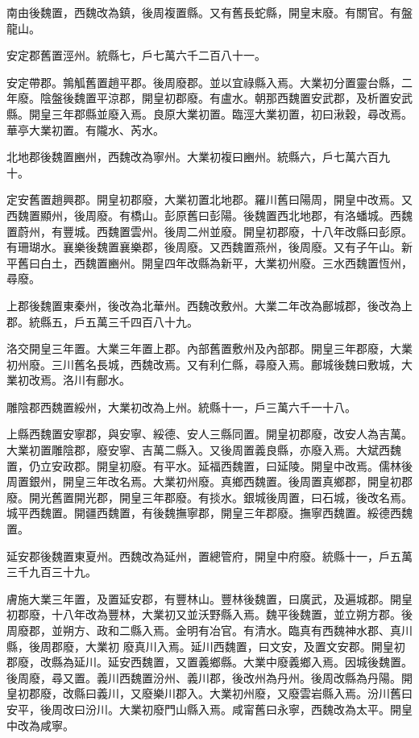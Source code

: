 \begin{pinyinscope}
 南由後魏置，西魏改為鎮，後周複置縣。又有舊長蛇縣，開皇末廢。有關官。有盤龍山。



 安定郡舊置涇州。統縣七，戶七萬六千二百八十一。



 安定帶郡。鶉觚舊置趙平郡。後周廢郡。並以宜祿縣入焉。大業初分置靈台縣，二年廢。陰盤後魏置平涼郡，開皇初郡廢。有盧水。朝那西魏置安武郡，及析置安武縣。開皇三年郡縣並廢入焉。良原大業初置。臨涇大業初置，初曰湫穀，尋改焉。華亭大業初置。有隴水、芮水。



 北地郡後魏置豳州，西魏改為寧州。大業初複曰豳州。統縣六，戶七萬六百九
 十。



 定安舊置趙興郡。開皇初郡廢，大業初置北地郡。羅川舊曰陽周，開皇中改焉。又西魏置顯州，後周廢。有橋山。彭原舊曰彭陽。後魏置西北地郡，有洛蟠城。西魏置蔚州，有豐城。西魏置雲州。後周二州並廢。開皇初郡廢，十八年改縣曰彭原。有珊瑚水。襄樂後魏置襄樂郡，後周廢。又西魏置燕州，後周廢。又有子午山。新平舊曰白土，西魏置豳州。開皇四年改縣為新平，大業初州廢。三水西魏置恆州，尋廢。



 上郡後魏置東秦州，後改為北華州。西魏改敷州。大業二年改為鄜城郡，後改為上郡。統縣五，戶五萬三千四百八十九。



 洛交開皇三年置。大業三年置上郡。內部舊置敷州及內部郡。開皇三年郡廢，大業初州廢。三川舊名長城，西魏改焉。又有利仁縣，尋廢入焉。鄜城後魏曰敷城，大業初改焉。洛川有鄜水。



 雕陰郡西魏置綏州，大業初改為上州。統縣十一，戶三萬六千一十八。



 上縣西魏置安寧郡，與安寧、綏德、安人三縣同置。開皇初郡廢，改安人為吉萬。大業初置雕陰郡，廢安寧、吉萬二縣入。又後周置義良縣，亦廢入焉。大斌西魏置，仍立安政郡。開皇初廢。有平水。延福西魏置，曰延陵。開皇中改焉。儒林後周置銀州，開皇三年改名焉。大業初州廢。真鄉西魏置。後周置真鄉郡，開皇初郡廢。開光舊置開光郡，開皇三年郡廢。有掞水。銀城後周置，曰石城，後改名焉。城平西魏置。開疆西魏置，有後魏撫寧郡，開皇三年郡廢。撫寧西魏置。綏德西魏置。



 延安郡後魏置東夏州。西魏改為延州，置總管府，開皇中府廢。統縣十一，戶五萬三千九百三十九。



 膚施大業三年置，及置延安郡，有豐林山。豐林後魏置，曰廣武，及遍城郡。開皇初郡廢，十八年改為豐林，大業初又並沃野縣入焉。魏平後魏置，並立朔方郡。後周廢郡，並朔方、政和二縣入焉。金明有冶官。有清水。臨真有西魏神水郡、真川縣，後周郡廢，大業初
 廢真川入焉。延川西魏置，曰文安，及置文安郡。開皇初郡廢，改縣為延川。延安西魏置，又置義鄉縣。大業中廢義鄉入焉。因城後魏置。後周廢，尋又置。義川西魏置汾州、義川郡，後改州為丹州。後周改縣為丹陽。開皇初郡廢，改縣曰義川，又廢樂川郡入。大業初州廢，又廢雲岩縣入焉。汾川舊曰安平，後周改曰汾川。大業初廢門山縣入焉。咸甯舊曰永寧，西魏改為太平。開皇中改為咸寧。




\end{pinyinscope}
